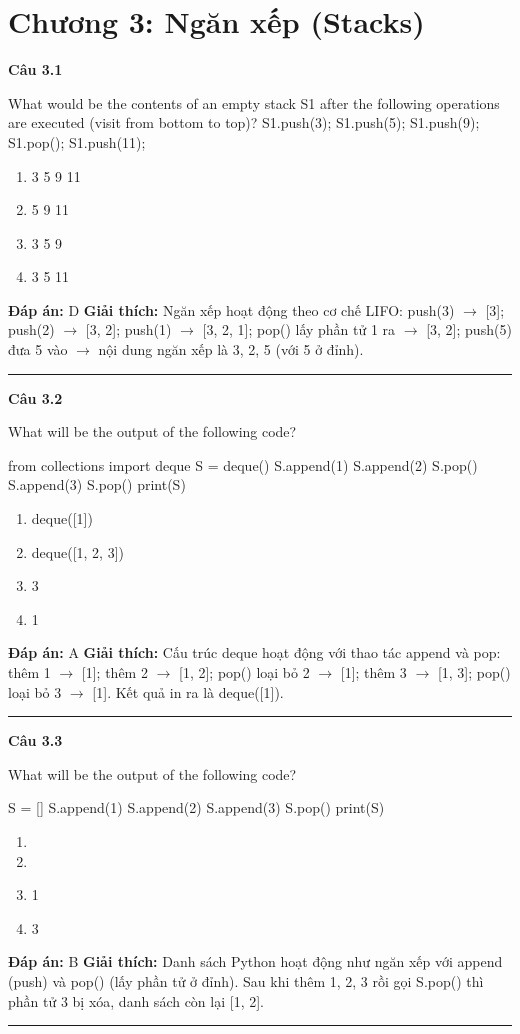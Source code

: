 \documentclass[11pt,a4paper]{article}
\newenvironment{question}[1]{%
  \par\vspace{1em}\noindent\textbf{\large Câu #1}\par\vspace{0.4em}
}{%
  \par\vspace{1em}\hrule\vspace{0.6em}
}
\newenvironment{choices}{%
  \begin{enumerate}[label=\textbf{\Alph*.},leftmargin=2.2em,itemsep=2pt,topsep=3pt]
}{%
  \end{enumerate}
}
\newcommand{\choice}{\item}
\newenvironment{codebox}{%
  \begin{tcolorbox}[colback=gray!8!white,colframe=gray!50!black,arc=1.5mm,boxrule=0.6pt,left=3mm,right=3mm,top=2.5mm,bottom=2.5mm]
  \ttfamily\small
}{%
  \end{tcolorbox}
}
\begin{document}
\newpage
\section*{Chương 3: Ngăn xếp (Stacks)}


\begin{question}{3.1}
What would be the contents of an empty stack S1 after the following operations are executed (visit from bottom to top)? S1.push(3); S1.push(5); S1.push(9); S1.pop(); S1.push(11);
\begin{choices}
\choice 3 5 9 11
\choice 5 9 11
\choice 3 5 9
\choice 3 5 11
\end{choices}
\textbf{Đáp án:} D
\textbf{Giải thích:} Ngăn xếp hoạt động theo cơ chế LIFO: push(3) \(\to\) [3]; push(2) \(\to\) [3, 2]; push(1) \(\to\) [3, 2, 1]; pop() lấy phần tử 1 ra \(\to\) [3, 2]; push(5) đưa 5 vào \(\to\) nội dung ngăn xếp là 3, 2, 5 (với 5 ở đỉnh).
\end{question}

\begin{question}{3.2}
What will be the output of the following code?
\begin{codebox}
from collections import deque
S = deque()
S.append(1)
S.append(2)
S.pop()
S.append(3)
S.pop()
print(S)
\end{codebox}
\begin{choices}
\choice deque([1])
\choice deque([1, 2, 3])
\choice 3
\choice 1
\end{choices}
\textbf{Đáp án:} A
\textbf{Giải thích:} Cấu trúc deque hoạt động với thao tác append và pop: thêm 1 \(\to\) [1]; thêm 2 \(\to\) [1, 2]; pop() loại bỏ 2 \(\to\) [1]; thêm 3 \(\to\) [1, 3]; pop() loại bỏ 3 \(\to\) [1]. Kết quả in ra là deque([1]).
\end{question}

\begin{question}{3.3}
What will be the output of the following code?
\begin{codebox}
S = []
S.append(1)
S.append(2)
S.append(3)
S.pop()
print(S)
\end{codebox}
\begin{choices}
\choice [1, 2, 3]
\choice [1, 2]
\choice 1
\choice 3
\end{choices}
\textbf{Đáp án:} B
\textbf{Giải thích:} Danh sách Python hoạt động như ngăn xếp với append (push) và pop() (lấy phần tử ở đỉnh). Sau khi thêm 1, 2, 3 rồi gọi S.pop() thì phần tử 3 bị xóa, danh sách còn lại [1, 2].
\end{question}
\end{document}
